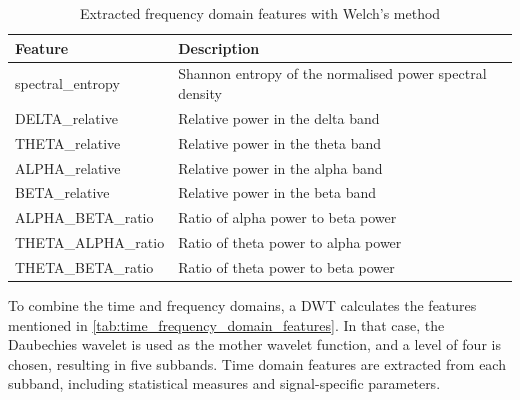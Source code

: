     \begin{table}[h!]
      \centering
      \begin{tabular}{|p{}|p{}|}
        \hline
        \textbf{Feature} & \textbf{Description} \\
        \hline
        spectral\_entropy & Shannon entropy of the normalised power spectral density \\
        \hline
        DELTA\_relative & Relative power in the delta band \\
        \hline
        THETA\_relative & Relative power in the theta band \\
        \hline
        ALPHA\_relative & Relative power in the alpha band \\
        \hline
        BETA\_relative & Relative power in the beta band \\
        \hline
        ALPHA\_BETA\_ratio & Ratio of alpha power to beta power \\
        \hline
        THETA\_ALPHA\_ratio & Ratio of theta power to alpha power \\
        \hline
        THETA\_BETA\_ratio & Ratio of theta power to beta power \\
        \hline
      \end{tabular}
      \caption{Extracted frequency domain features with Welch's method}
      \label{tab:frequency_domain_features}
    \end{table}
    To combine the time and frequency domains, a \ac{DWT} calculates the features mentioned in \autoref{tab:time_frequency_domain_features}. In that case, the Daubechies wavelet is used as the mother wavelet function, and a level of four is chosen, resulting in five subbands. Time domain features are extracted from each subband, including statistical measures and signal-specific parameters. \par
